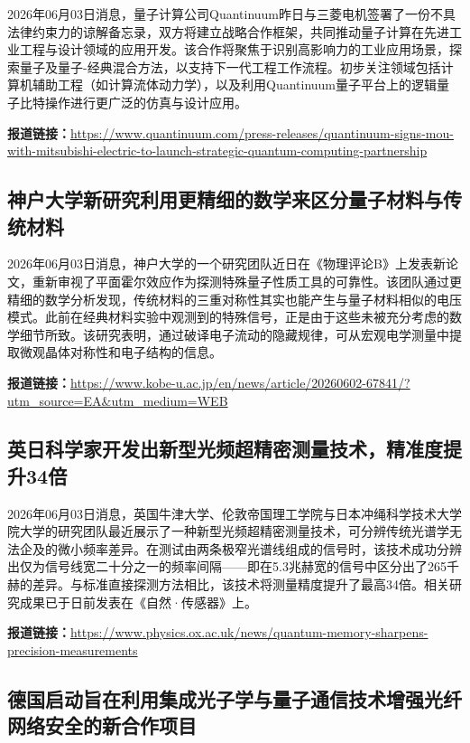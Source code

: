 \documentclass[12pt,a4paper]{ctexart}
\begin{document}
2026年06月03日消息，量子计算公司Quantinuum昨日与三菱电机签署了一份不具法律约束力的谅解备忘录，双方将建立战略合作框架，共同推动量子计算在先进工业工程与设计领域的应用开发。该合作将聚焦于识别高影响力的工业应用场景，探索量子及量子-经典混合方法，以支持下一代工程工作流程。初步关注领域包括计算机辅助工程（如计算流体动力学），以及利用Quantinuum量子平台上的逻辑量子比特操作进行更广泛的仿真与设计应用。

\noindent\textbf{报道链接：}\url{https://www.quantinuum.com/press-releases/quantinuum-signs-mou-with-mitsubishi-electric-to-launch-strategic-quantum-computing-partnership}

\subsection{ 神户大学新研究利用更精细的数学来区分量子材料与传统材料 }

2026年06月03日消息，神户大学的一个研究团队近日在《物理评论B》上发表新论文，重新审视了平面霍尔效应作为探测特殊量子性质工具的可靠性。该团队通过更精细的数学分析发现，传统材料的三重对称性其实也能产生与量子材料相似的电压模式。此前在经典材料实验中观测到的特殊信号，正是由于这些未被充分考虑的数学细节所致。该研究表明，通过破译电子流动的隐藏规律，可从宏观电学测量中提取微观晶体对称性和电子结构的信息。

\noindent\textbf{报道链接：}\url{https://www.kobe-u.ac.jp/en/news/article/20260602-67841/?utm\_source=EA\&utm\_medium=WEB}

\subsection{ 英日科学家开发出新型光频超精密测量技术，精准度提升34倍 }

2026年06月03日消息，英国牛津大学、伦敦帝国理工学院与日本冲绳科学技术大学院大学的研究团队最近展示了一种新型光频超精密测量技术，可分辨传统光谱学无法企及的微小频率差异。在测试由两条极窄光谱线组成的信号时，该技术成功分辨出仅为信号线宽二十分之一的频率间隔——即在5.3兆赫宽的信号中区分出了265千赫的差异。与标准直接探测方法相比，该技术将测量精度提升了最高34倍。相关研究成果已于日前发表在《自然·传感器》上。

\noindent\textbf{报道链接：}\url{https://www.physics.ox.ac.uk/news/quantum-memory-sharpens-precision-measurements}

\subsection{ 德国启动旨在利用集成光子学与量子通信技术增强光纤网络安全的新合作项目 }
\end{document}
